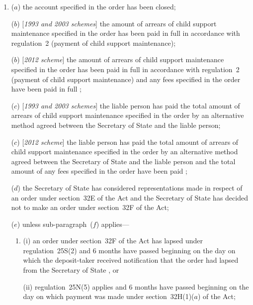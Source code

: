 \documentclass[12pt,a4paper]{article}
\begin{document}
\begin{enumerate}\item[]
($a$) the account specified in the order has been closed;

($b$) [\emph{1993 and 2003 schemes}] the amount of arrears of child support maintenance specified in the order has been paid in full in accordance with regulation~2 (payment of child support maintenance);

($b$) [\emph{2012 scheme}] the amount of arrears of child support maintenance specified in the order has been paid in full in accordance with regulation~2 (payment of child support maintenance)
and any fees specified in the order have been paid in full%
;

($c$) [\emph{1993 and 2003 schemes}] the liable person has paid the total amount of arrears of child support maintenance specified in the order by an alternative method agreed between the 
Secretary of State  %
and the liable person;

($c$) [\emph{2012 scheme}] the liable person has paid the total amount of arrears of child support maintenance specified in the order by an alternative method agreed between the 
Secretary of State  %
and the liable person
and the total amount of any fees specified in the order have been paid%
;

($d$) the 
Secretary of State  %
has considered representations made in respect of an order under section~32E of the Act and 
the Secretary of State  %
has decided not to make an order under section~32F of the Act;

($e$) unless sub-paragraph~($f$)  applies—
\begin{enumerate}\item[]
(i) an order under section~32F of the Act has lapsed under regulation~25S(2) and 6 months have passed beginning on the day on which the deposit-taker received notification that the order had lapsed from the 
Secretary of State%
, or

(ii) regulation~25N(5) applies and 6 months have passed beginning on the day on which payment was made under section~32H(1)($a$)  of the Act;
\end{enumerate}


\end{enumerate}
\end{document}
